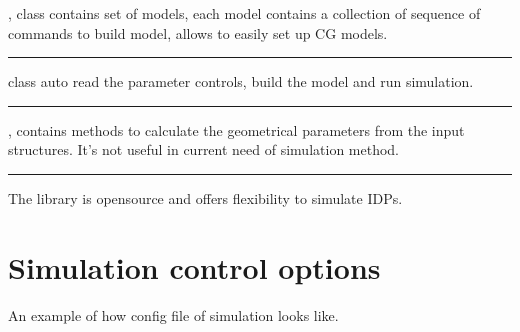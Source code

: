 \documentclass[letterpaper,10pt,english]{sphinxmanual}
\begin{document}
\sphinxAtStartPar
{}, class contains set of models, each model contains a collection of sequence of commands
to build model, allows to easily set up CG models.


\bigskip\hrule\bigskip


\sphinxAtStartPar
{} class auto read the parameter controls, build the model and run simulation.


\bigskip\hrule\bigskip


\sphinxAtStartPar
{}, contains methods to calculate the geometrical parameters from the input structures.
It’s not useful in current need of simulation method.


\bigskip\hrule\bigskip


\sphinxAtStartPar
The library is open\sphinxhyphen{}source and offers flexibility to simulate IDPs.

\sphinxstepscope


\chapter{Simulation control options}
\label{\detokenize{usage/simulation_control:simulation-control-options}}\label{\detokenize{usage/simulation_control::doc}}
\sphinxAtStartPar
An example of how config file of simulation looks like.
\end{document}
